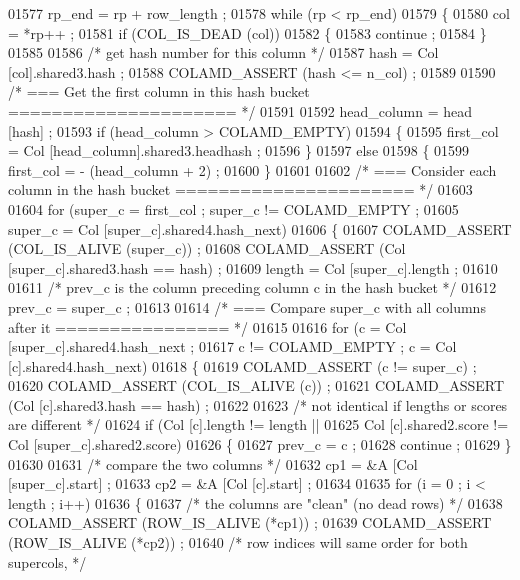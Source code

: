 \begin{DoxyCode}
{{{{{{{{{{{{{{{{{{{{{{{{{{{{01577   rp\_end = rp + row\_length ;
01578   \textcolor{keywordflow}{while} (rp < rp\_end)
01579   \{
01580     col = *rp++ ;
01581     \textcolor{keywordflow}{if} (COL\_IS\_DEAD (col))
01582     \{
01583       continue ;
01584     \}
01585 
01586     \textcolor{comment}{/* get hash number for this column */}
01587     hash = Col [col].shared3.hash ;
01588     COLAMD\_ASSERT (hash <= n\_col) ;
01589 
01590     \textcolor{comment}{/* === Get the first column in this hash bucket ===================== */}
01591 
01592     head\_column = head [hash] ;
01593     \textcolor{keywordflow}{if} (head\_column > COLAMD\_EMPTY)
01594     \{
01595       first\_col = Col [head\_column].shared3.headhash ;
01596     \}
01597     \textcolor{keywordflow}{else}
01598     \{
01599       first\_col = - (head\_column + 2) ;
01600     \}
01601 
01602     \textcolor{comment}{/* === Consider each column in the hash bucket ====================== */}
01603 
01604     \textcolor{keywordflow}{for} (super\_c = first\_col ; super\_c != COLAMD\_EMPTY ;
01605      super\_c = Col [super\_c].shared4.hash\_next)
01606     \{
01607       COLAMD\_ASSERT (COL\_IS\_ALIVE (super\_c)) ;
01608       COLAMD\_ASSERT (Col [super\_c].shared3.hash == hash) ;
01609       length = Col [super\_c].length ;
01610 
01611       \textcolor{comment}{/* prev\_c is the column preceding column c in the hash bucket */}
01612       prev\_c = super\_c ;
01613 
01614       \textcolor{comment}{/* === Compare super\_c with all columns after it ================ */}
01615 
01616       \textcolor{keywordflow}{for} (c = Col [super\_c].shared4.hash\_next ;
01617        c != COLAMD\_EMPTY ; c = Col [c].shared4.hash\_next)
01618       \{
01619     COLAMD\_ASSERT (c != super\_c) ;
01620     COLAMD\_ASSERT (COL\_IS\_ALIVE (c)) ;
01621     COLAMD\_ASSERT (Col [c].shared3.hash == hash) ;
01622 
01623     \textcolor{comment}{/* not identical if lengths or scores are different */}
01624     \textcolor{keywordflow}{if} (Col [c].length != length ||
01625         Col [c].shared2.score != Col [super\_c].shared2.score)
01626     \{
01627       prev\_c = c ;
01628       continue ;
01629     \}
01630 
01631     \textcolor{comment}{/* compare the two columns */}
01632     cp1 = &A [Col [super\_c].start] ;
01633     cp2 = &A [Col [c].start] ;
01634 
01635     \textcolor{keywordflow}{for} (i = 0 ; i < length ; i++)
01636     \{
01637       \textcolor{comment}{/* the columns are "clean" (no dead rows) */}
01638       COLAMD\_ASSERT (ROW\_IS\_ALIVE (*cp1))  ;
01639       COLAMD\_ASSERT (ROW\_IS\_ALIVE (*cp2))  ;
01640       \textcolor{comment}{/* row indices will same order for both supercols, */}
}}}}}}}}}}}}}}}}}}}}}}}}}}}}
\end{DoxyCode}
